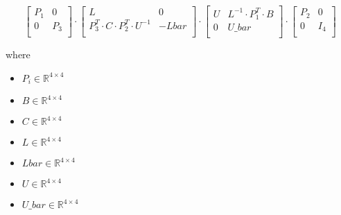 \documentclass[12pt]{article}
\begin{document}
\[
\begin{bmatrix}
\textit{P}_{ 1 } & 0\\
0 & \textit{P}_{ 3 }\\
\end{bmatrix} \cdot \begin{bmatrix}
\textit{L} & 0\\
\textit{P}_{ 3 }^T \cdot \textit{C} \cdot \textit{P}_{ 2 }^T \cdot \textit{U}^{-1} & -\textit{Lbar}\\
\end{bmatrix} \cdot \begin{bmatrix}
\textit{U} & \textit{L}^{-1} \cdot \textit{P}_{ 1 }^T \cdot \textit{B}\\
0 & \textit{U\_bar}\\
\end{bmatrix} \cdot \begin{bmatrix}
\textit{P}_{ 2 } & 0\\
0 & I_{ 4 }\\
\end{bmatrix}
\]

where
\begin{itemize}
\item $\textit{P}_{\textit{i}} \in \mathbb{R}^{ 4 \times 4 }$
\item $\textit{B} \in \mathbb{R}^{ 4 \times 4 }$
\item $\textit{C} \in \mathbb{R}^{ 4 \times 4 }$
\item $\textit{L} \in \mathbb{R}^{ 4 \times 4 }$
\item $\textit{Lbar} \in \mathbb{R}^{ 4 \times 4 }$
\item $\textit{U} \in \mathbb{R}^{ 4 \times 4 }$
\item $\textit{U\_bar} \in \mathbb{R}^{ 4 \times 4 }$
\end{itemize}
\end{document}
